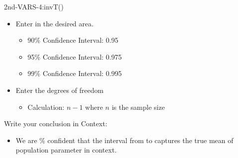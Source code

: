 \documentclass[../stats.tex]{subfiles}
\begin{document}
\begin{itemize}
\begin{itemize}
        2nd-VARS-4:invT()
        \begin{itemize}
            \item Enter in the desired area.
            \begin{itemize}
                \item 90\% Confidence Interval: 0.95 
                \item 95\% Confidence Interval: 0.975
                \item 99\% Confidence Interval: 0.995
            \end{itemize}
            \item Enter the degrees of freedom 
            \begin{itemize}
                \item Calculation: $n-1$ where $n$ is the sample size 
            \end{itemize}
        \end{itemize}
    \end{itemize}
\end{itemize}
Write your conclusion in Context:
\begin{itemize}
    \item We are \blank\% confident that the interval from \blank to \blank captures the true mean of {population parameter in context}.
\end{itemize}
\end{document}
